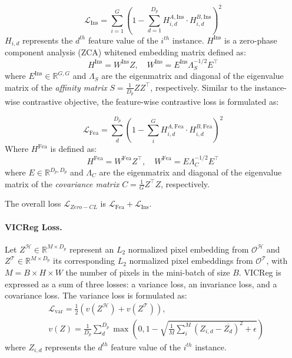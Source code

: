 \begin{equation}
    \label{zero_icl}
    \mathcal{L}_{\text{Ins}} = \sum_{i=1}^{G} \left( 1 - \sum_{d=1}^{D_p} H^{A,\text{Ins}}_{i, d} \cdot H^{B,\text{Ins}}_{i, d} \right)^2
\end{equation}
\( H_{i,d} \) represents the $d^{th}$ feature value of the $i^{th}$ instance. $H^{\text{Ins}}$ is a zero-phase component analysis (ZCA) whitened embedding matrix defined as:
\begin{equation}
    \label{zca_whitening_ins}
    H^{\text{Ins}} = W^{\text{Ins}} Z, \quad W^{\text{Ins}} = E^{\text{Ins}} \Lambda_S^{-1/2} E^\top
\end{equation}
where \( E^{\text{Ins}} \in \mathbb{R}^{G,G}\) and \( \Lambda_S \) are the eigenmatrix and diagonal of the eigenvalue matrix of the \emph{affinity matrix} $S=\frac{1}{D_p}ZZ^\top$, respectively.
Similar to the instance-wise contrastive objective, the feature-wise contrastive loss is formulated as:

\begin{equation}
    \label{zero_fcl}
       \mathcal{L}_{\text{Fea}} = \sum_{d}^{D_p} \left( 1 - \sum_{i}^{G} H^{A,\text{Fea}}_{i, d} \cdot H^{B,\text{Fea}}_{i, d} \right)^2
\end{equation}
Where $H^{\text{Fea}}$ is defined as:
\begin{equation}
    \label{zca_whitening_fea}
    H^{\text{Fea}} = W^{\text{Fea}} Z^\top, \quad W^{\text{Fea}} = E \Lambda_C^{-1/2} E^\top
\end{equation}
where \( E \in \mathbb{R}^{D_p,D_p}\) and \( \Lambda_C \) are the eigenmatrix and diagonal of the eigenvalue matrix of the \emph{covariance matrix} $C=\frac{1}{G}Z^\top Z$, respectively.

The overall loss $\mathcal{L}_{Zero-CL}$ is $\mathcal{L}_{\text{Fea}} + \mathcal{L}_{\text{Ins}}$.

\paragraph{VICReg Loss.}
Let \( Z^\mathcal{H} \in \mathbb{R}^{M\times D_{p}} \) represent an $L_2$ normalized pixel embedding from \( \mathcal{O}^\mathcal{H}\) and \( Z^\mathcal{T} \in \mathbb{R}^{M \times D_{p}} \) its corresponding $L_2$ normalized pixel embeddings from \( \mathcal{O}^\mathcal{T}\), with \( M = B \times H \times W \) the number of pixels in the mini-batch of size $B$.
VICReg is expressed as a sum of three losses: a variance loss, an invariance loss, and a covariance loss. The variance loss is formulated as:
\begin{equation}
    \label{var_loss}
    \begin{split}
    & \mathcal{L}_{\text{var}} = \frac{1}{2} (v(Z^\mathcal{H})+v(Z^\mathcal{T})),\\
    & v(Z) = \frac{1}{D_p}\sum_d^{D_p}\max\left(0,1-\sqrt{\frac{1}{M}\sum_i^M(Z_{i,d}-\overline{Z_d})^2+\epsilon}\right)
    \end{split}
\end{equation}
where \( Z_{i,d} \) represents the $d^{th}$ feature value of the $i^{th}$ instance.


